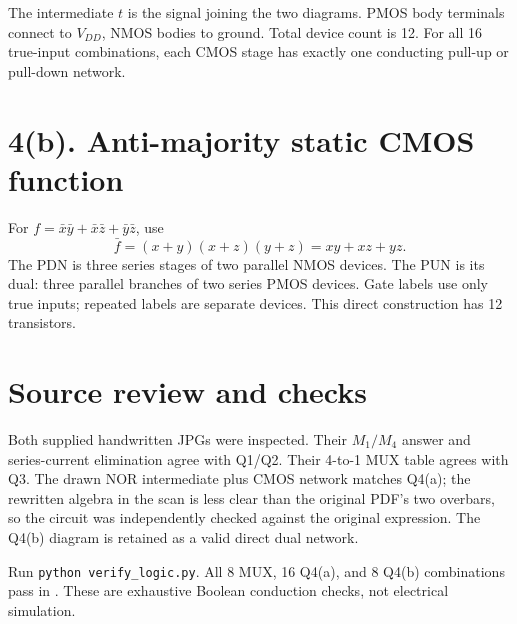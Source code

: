 \documentclass[11pt]{article}
\newcommand{\mos}[4]{\begin{scope}[shift={(#1,#2)}]
\draw (0,.24)--(0,-.24);
\draw (0,.20)--(.25,.20)--(.25,.5);
\draw (0,-.20)--(.25,-.20)--(.25,-.5);
\draw (-.16,.23)--(-.16,-.23);
\ifnum#4=1\draw (-.26,0) circle (.06);\draw (-.75,0)--(-.32,0);\else\draw (-.75,0)--(-.16,0);\fi
\node[anchor=east,font=\small] at (-.76,0) {$#3$};
\end{scope}}
\newcommand{\ground}[2]{\draw (#1,#2)--(#1,{#2-.12});\draw ({#1-.17},{#2-.12})--({#1+.17},{#2-.12});\draw ({#1-.11},{#2-.20})--({#1+.11},{#2-.20});}
\newcommand{\rail}[3]{\draw (#1,#2)--(#1,{#2+.15});\node[above,font=\small] at (#1,{#2+.15}) {$#3$};}
\newcommand{\outputnode}[3]{\fill (#1,#2) circle (.04);\draw (#1,#2)--({#1+.7},#2) node[right] {$#3$};}
\begin{document}
\begin{center}\end{center}
The intermediate $t$ is the signal joining the two diagrams. PMOS body terminals connect to $V_{DD}$, NMOS bodies to ground. Total device count is 12. For all 16 true-input combinations, each CMOS stage has exactly one conducting pull-up or pull-down network.

\newpage\section*{4(b). Anti-majority static CMOS function}
For $f=\bar x\bar y+\bar x\bar z+\bar y\bar z$, use
\[
\bar f=(x+y)(x+z)(y+z)=xy+xz+yz.
\]
The PDN is three series stages of two parallel NMOS devices. The PUN is its dual: three parallel branches of two series PMOS devices. Gate labels use only true inputs; repeated labels are separate devices. This direct construction has 12 transistors.
\begin{center}\end{center}
\section*{Source review and checks}
Both supplied handwritten JPGs were inspected. Their $M_1/M_4$ answer and series-current elimination agree with Q1/Q2. Their 4-to-1 MUX table agrees with Q3. The drawn NOR intermediate plus CMOS network matches Q4(a); the rewritten algebra in the scan is less clear than the original PDF's two overbars, so the circuit was independently checked against the original expression. The Q4(b) diagram is retained as a valid direct dual network.

Run \texttt{python verify\_logic.py}. All 8 MUX, 16 Q4(a), and 8 Q4(b) combinations pass in . These are exhaustive Boolean conduction checks, not electrical simulation.
\end{document}

